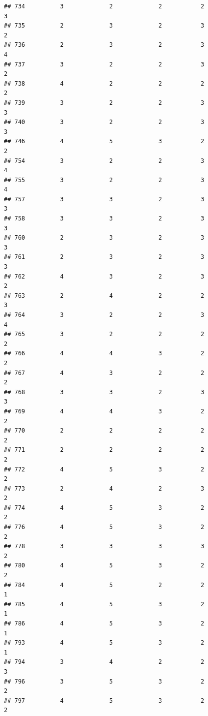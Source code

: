\documentclass[
]{article}
\begin{document}
\begin{verbatim}
## 734          3             2             2           2             3
## 735          2             3             2           3             2
## 736          2             3             2           3             4
## 737          3             2             2           3             2
## 738          4             2             2           2             2
## 739          3             2             2           3             3
## 740          3             2             2           3             3
## 746          4             5             3           2             2
## 754          3             2             2           3             4
## 755          3             2             2           3             4
## 757          3             3             2           3             3
## 758          3             3             2           3             3
## 760          2             3             2           3             3
## 761          2             3             2           3             3
## 762          4             3             2           3             2
## 763          2             4             2           2             3
## 764          3             2             2           3             4
## 765          3             2             2           2             2
## 766          4             4             3           2             2
## 767          4             3             2           2             2
## 768          3             3             2           3             3
## 769          4             4             3           2             2
## 770          2             2             2           2             2
## 771          2             2             2           2             2
## 772          4             5             3           2             2
## 773          2             4             2           3             2
## 774          4             5             3           2             2
## 776          4             5             3           2             2
## 778          3             3             3           3             2
## 780          4             5             3           2             2
## 784          4             5             2           2             1
## 785          4             5             3           2             1
## 786          4             5             3           2             1
## 793          4             5             3           2             1
## 794          3             4             2           2             3
## 796          3             5             3           2             2
## 797          4             5             3           2             2

\end{verbatim}
\end{document}
